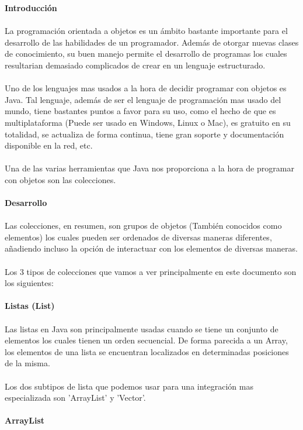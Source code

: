 \documentclass{article}
\begin{document}
	\newpage
	\huge \textbf{Introducción}
	\\
	\\
	\normalsize La programación orientada a objetos es un ámbito bastante importante para el desarrollo de las habilidades de un programador. Además de otorgar nuevas clases de conocimiento, su buen manejo permite el
	desarrollo de programas los cuales resultarian demasiado complicados de crear en un lenguaje estructurado.
	\\
	\\
	Uno de los lenguajes mas usados a la hora de decidir programar con objetos es Java. Tal lenguaje, además de ser el lenguaje de programación mas usado del mundo, tiene bastantes puntos a favor para su uso, como el hecho de 
	que es multiplataforma (Puede ser usado en Windows, Linux o Mac), es gratuito en su totalidad, se actualiza de forma continua, tiene gran soporte y documentación disponible en la red, etc.
	\\
	\\
	Una de las varias herramientas que Java nos proporciona a la hora de programar con objetos son las colecciones.
	\\
	\\
	\huge \textbf {Desarrollo}
	\\
	\\
	\normalsize Las colecciones, en resumen, son grupos de objetos (También conocidos como elementos) los cuales pueden ser ordenados de diversas maneras diferentes, añadiendo incluso la opción de interactuar con los elementos de diversas maneras.
	\\
	\\
	Los 3 tipos de colecciones que vamos a ver principalmente en este documento son los siguientes:
	\\
	\\
	\Large \textbf {Listas (List)}
	\\
	\\
	\normalsize Las listas en Java son principalmente usadas cuando se tiene un conjunto de elementos los cuales tienen un orden secuencial. De forma parecida a un Array, los elementos de una lista se encuentran localizados en determinadas posiciones de la misma.
	\\
	\\
	Los dos subtipos de lista que podemos usar para una integración mas especializada son 'ArrayList' y 'Vector'.
	\\
	\\
	\large \textbf {ArrayList}
	\\
\end{document}
